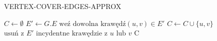\begin{algorithm}
\caption{VERTEX-COVER-EDGES-APPROX}\label{euclid}
\begin{algorithmic}[1]
\State $C \gets \emptyset$
\State $E' \gets G.E$
\State $\text{weź dowolna krawędź}(u,v) \in E'$
\State $C \gets C \cup \{u,v\}$
\State $\text{usuń z } E' \text{ incydentne krawędzie z } u \text{ lub } v $
\EndWhile
\State \Return C
\EndFunction
\end{algorithmic}
\end{algorithm}
